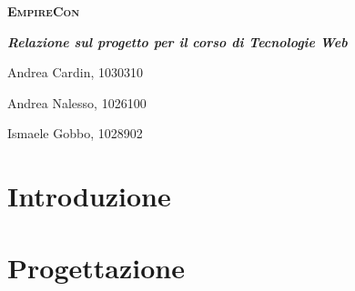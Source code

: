 \documentclass[12pt,a4paper]{article}
\begin{document}
\begin{titlepage}
	\centering
	\vspace*{4.5cm}
	{\scshape\LARGE \textbf{EmpireCon} \par}
	\vspace{0.5cm}
	{\Large \textbf{\textit{Relazione sul progetto per il corso di Tecnologie Web}}\par}
	\vspace{1cm}
	{\Large Andrea Cardin, 1030310\par}
	{\Large Andrea Nalesso, 1026100\par}
	{\Large Ismaele Gobbo, 1028902\par}
	\vspace*{\fill}
\end{titlepage}

\tableofcontents
\newpage

% 
% 

\section{Introduzione}

\newpage

\section{Progettazione}

\newpage
\end{document}
